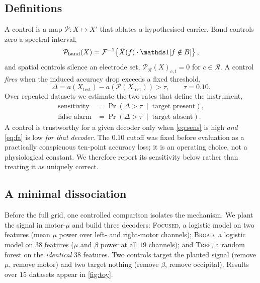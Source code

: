 \documentclass[manuscript,nonacm]{acmart}
\begin{document}
\subsection{Definitions}
A control is a map $\mathcal{P}:X\mapsto X'$ that ablates a hypothesised carrier. Band
controls zero a spectral interval,
\begin{equation}
\mathcal{P}_{\text{band}}(X)=\mathcal{F}^{-1}\!\left\{
  \tilde{X}(f)\cdot\ind\!\left[f\notin B\right]\right\},
\label{eq:pband}
\end{equation}
and spatial controls silence an electrode set, $\mathcal{P}_{\mathcal{R}}(X)_{c,t}=0$ for
$c\in\mathcal{R}$. A control \emph{fires} when the induced accuracy drop exceeds a fixed
threshold,
\begin{equation}
\Delta = a\!\left(X_{\text{test}}\right)-a\!\left(\mathcal{P}(X_{\text{test}})\right)
> \tau, \qquad \tau=0.10 .
\label{eq:fire}
\end{equation}
Over repeated datasets we estimate the two rates that define the instrument,
\begin{align}
\text{sensitivity} &= \Pr\!\left(\Delta>\tau \;\middle|\; \text{target present}\right),
\label{eq:sens}\\
\text{false alarm} &= \Pr\!\left(\Delta>\tau \;\middle|\; \text{target absent}\right).
\label{eq:fa}
\end{align}
A control is trustworthy for a given decoder only when \eqref{eq:sens} is high
\emph{and} \eqref{eq:fa} is low \emph{for that decoder}.
The $0.10$ cutoff was fixed before evaluation as a practically conspicuous ten-point
accuracy loss; it is an operating choice, not a physiological constant. We therefore
report its sensitivity below rather than treating it as uniquely correct.

\subsection{A minimal dissociation}
Before the full grid, one controlled comparison isolates the mechanism. We plant the
signal in motor-$\mu$ and build three decoders: \textsc{Focused}, a logistic model on two
features (mean $\mu$ power over left- and right-motor channels); \textsc{Broad}, a
logistic model on $38$ features ($\mu$ and $\beta$ power at all $19$ channels); and
\textsc{Tree}, a random forest on the \emph{identical} $38$ features. Two controls target
the planted signal (remove $\mu$, remove motor) and two target nothing (remove $\beta$,
remove occipital). Results over $15$ datasets appear in \cref{fig:toy}.
\end{document}
